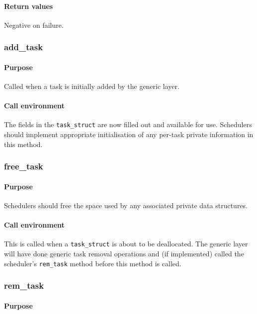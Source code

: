 \documentclass[11pt,twoside,final,openright]{xenstyle}
\begin{document}
\paragraph*{Return values}
Negative on failure.

\subsubsection{add\_task}

\paragraph*{Purpose}

Called when a task is initially added by the generic layer.

\paragraph*{Call environment}

The fields in the {\tt task\_struct} are now filled out and available for use.
Schedulers should implement appropriate initialisation of any per-task private
information in this method.

\subsubsection{free\_task}

\paragraph*{Purpose}

Schedulers should free the space used by any associated private data
structures.

\paragraph*{Call environment}

This is called when a {\tt task\_struct} is about to be deallocated.
The generic layer will have done generic task removal operations and
(if implemented) called the scheduler's {\tt rem\_task} method before
this method is called.

\subsubsection{rem\_task}

\paragraph*{Purpose}
\end{document}
